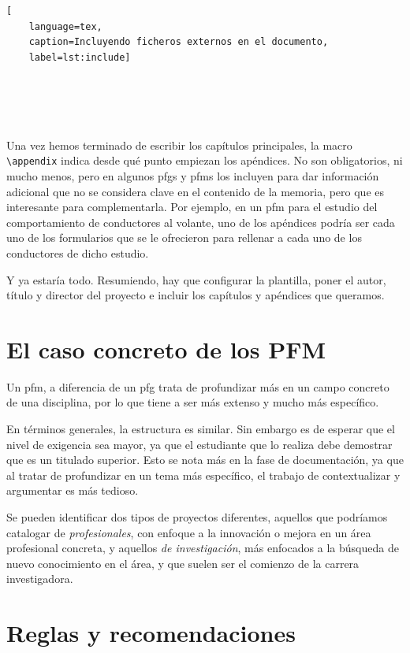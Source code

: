 \documentclass[%
    school=etsisi,%
    type=tfg,%
    degree=61CD,%
]{upm-report}
\begin{document}
\begin{lstlisting}[
    language=tex,
    caption=Incluyendo ficheros externos en el documento,
    label=lst:include]





\end{lstlisting}

Una vez hemos terminado de escribir los capítulos principales, la macro
\lstinline{\appendix} indica desde qué punto empiezan los apéndices. No
son obligatorios, ni mucho menos, pero en algunos \glspl{pfg} y
\glspl{pfm} los incluyen para dar información adicional que no se
considera clave en el contenido de la memoria, pero que es interesante
para complementarla. Por ejemplo, en un \gls{pfm} para el estudio del
comportamiento de conductores al volante, uno de los apéndices podría
ser cada uno de los formularios que se le ofrecieron para rellenar a
cada uno de los conductores de dicho estudio.

Y ya estaría todo. Resumiendo, hay que configurar la plantilla, poner
el autor, título y director del proyecto e incluir los capítulos y
apéndices que queramos.

\section{El caso concreto de los PFM}

Un \gls{pfm}, a diferencia de un \gls{pfg} trata de profundizar más en
un campo concreto de una disciplina, por lo que tiene a ser más extenso
y mucho más específico.

En términos generales, la estructura es similar. Sin embargo es de
esperar que el nivel de exigencia sea mayor, ya que el estudiante que
lo realiza debe demostrar que es un titulado superior. Esto se nota más
en la fase de documentación, ya que al tratar de profundizar en un tema
más específico, el trabajo de contextualizar y argumentar es más
tedioso.

Se pueden identificar dos tipos de proyectos diferentes, aquellos que
podríamos catalogar de \textit{profesionales}, con enfoque a la
innovación o mejora en un área profesional concreta, y aquellos
\textit{de investigación}, más enfocados a la búsqueda de nuevo
conocimiento en el área, y que suelen ser el comienzo de la carrera
investigadora.

\section{Reglas y recomendaciones}
\end{document}
